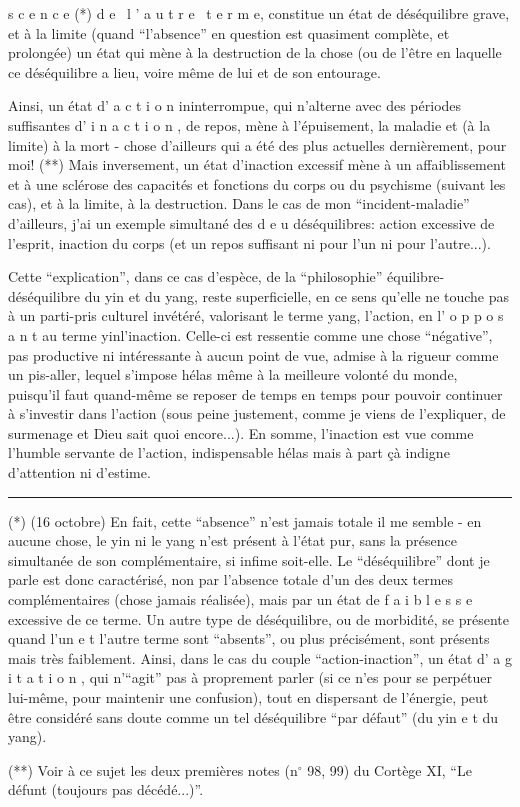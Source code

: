 
s c e n c e (*) d e \ l ' a u t r e \ t e r m e, constitue un état de déséquilibre grave, et à la limite (quand ``l'absence'' en question est quasiment complète, et prolongée) un état qui mène à la destruction de la chose (ou de l'être\unsure{)|:} en laquelle ce déséquilibre a lieu, voire même de lui et de son entourage.

Ainsi, un état d' a c t i o n ininterrompue, qui n'alterne avec des périodes suffisantes d' i n a c t i o n , de repos, mène à l'épuisement, la maladie et (à la limite) à la mort - chose d'ailleurs qui a été des plus actuelles dernièrement, pour moi! (**) Mais inversement, un état d'inaction excessif mène à un affaiblissement et à une sclérose des capacités et fonctions du corps ou du psychisme (suivant les cas), et à la limite, à la destruction. Dans le cas de mon ``incident-maladie'' d'ailleurs, j'ai un exemple simultané des d e u  déséquilibres: action excessive de l'esprit, inaction du corps (et un repos suffisant ni pour l'un ni pour l'autre...).

Cette ``explication'', dans ce cas d'espèce, de la ``philosophie'' équilibre-déséquilibre du yin et du yang, reste superficielle, en ce sens qu'elle ne touche pas à un parti-pris culturel invétéré, valorisant le terme yang, l'action, en l' o p p o s a n t au terme yin\handwritten{,}l'inaction. Celle-ci est ressentie comme une chose ``négative'', pas productive ni intéressante à aucun point de vue, admise à la rigueur comme un pis-aller, lequel s'impose hélas même à la meilleure volonté du monde, puisqu'il faut quand-même se reposer de temps en temps pour pouvoir continuer à s'investir dans l'action (sous peine justement, comme je viens de l'expliquer, de surmenage et Dieu sait quoi encore...). En somme, l'inaction est vue comme l'humble servante de l'action, indispensable hélas mais à part çà indigne d'attention ni d'estime.

\noindent\rule{.22\linewidth}{.4pt}\par
(*) (16 octobre) En fait, cette ``absence'' n'est jamais totale il me semble - en aucune chose, le yin ni le yang n'est présent à l'état pur, sans la présence simultanée de son complémentaire, si infime soit-elle. Le ``déséquilibre'' dont je parle est donc caractérisé, non par l'absence totale d'un des deux termes complémentaires (chose jamais réalisée), mais par un état de f a i b l e s s e excessive de ce terme. Un autre type de déséquilibre, ou de morbidité, se présente quand l'un e t l'autre terme sont ``absents'', ou plus précisément, sont présents mais très faiblement. Ainsi, dans le cas du couple ``action-inaction'', un état d' a g i t a t i o n , qui n'``agit'' pas à proprement parler (si ce n'es pour se perpétuer lui-même, pour maintenir une confusion), tout en dispersant de l'énergie, peut être considéré sans doute comme un tel déséquilibre ``par défaut'' (du yin e t du yang).

(**) Voir à ce sujet les deux premières notes (n$^\circ$ 98, 99) du Cortège XI, ``Le défunt (toujours pas décédé...)''.

